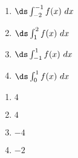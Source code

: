 {\noindent
\begin{minipage}{\linewidth}
\end{minipage}
\begin{enumerate}
\item		$\ds \int_{-2}^{-1} f(x)\ dx$
\item		$\ds \int_1^2 f(x)\ dx$
\item		$\ds \int_{-1}^1 f(x)\ dx$
\item		$\ds \int_0^1 f(x)\ dx$
\end{enumerate}

}
{\begin{enumerate}
\item		$4$
\item		$4$
\item		$-4$
\item		$-2$
\end{enumerate}
}

